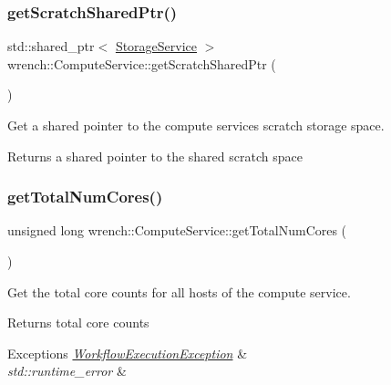 \subsubsection{\texorpdfstring{get\+Scratch\+Shared\+Ptr()}{getScratchSharedPtr()}}
{\footnotesize\ttfamily std\+::shared\+\_\+ptr$<$ \hyperlink{classwrench_1_1_storage_service}{Storage\+Service} $>$ wrench\+::\+Compute\+Service\+::get\+Scratch\+Shared\+Ptr (\begin{DoxyParamCaption}{ }\end{DoxyParamCaption})}



Get a shared pointer to the compute service\textquotesingle{}s scratch storage space. 

\begin{DoxyReturn}{Returns}
a shared pointer to the shared scratch space 
\end{DoxyReturn}
\mbox{\label{classwrench_1_1_compute_service_a5d2e4bca8b531521561f167769186f56}} 
\subsubsection{\texorpdfstring{get\+Total\+Num\+Cores()}{getTotalNumCores()}}
{\footnotesize\ttfamily unsigned long wrench\+::\+Compute\+Service\+::get\+Total\+Num\+Cores (\begin{DoxyParamCaption}{ }\end{DoxyParamCaption})}



Get the total core counts for all hosts of the compute service. 

\begin{DoxyReturn}{Returns}
total core counts
\end{DoxyReturn}

\begin{DoxyExceptions}{Exceptions}
{\em \hyperlink{classwrench_1_1_workflow_execution_exception}{Workflow\+Execution\+Exception}} & \\
\hline
{\em std\+::runtime\+\_\+error} & \\
\hline
\end{DoxyExceptions}
\mbox{\label{classwrench_1_1_compute_service_a225719efa4cb6c3b910c20e8828cb789}} 
